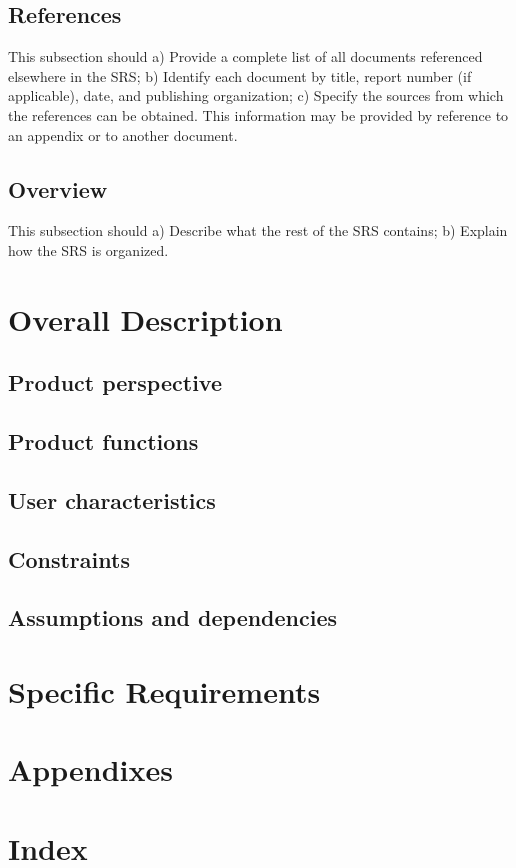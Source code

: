 \documentclass[10pt,letterpaper,onecolumn,draftclsnofoot]{IEEEtran}
\begin{document}
\subsection{References}
This subsection should
a) Provide a complete list of all documents referenced elsewhere in the SRS;
b) Identify each document by title, report number (if applicable), date, and publishing organization;
c) Specify the sources from which the references can be obtained.
This information may be provided by reference to an appendix or to another document.
\subsection{Overview}
This subsection should
a) Describe what the rest of the SRS contains;
b) Explain how the SRS is organized.
\clearpage
\section{Overall Description}
\subsection{Product perspective}
\subsection{Product functions}
\subsection{User characteristics}
\subsection{Constraints}
\subsection{Assumptions and dependencies}
\section{Specific Requirements}
\clearpage
\section{Appendixes}
\section{Index}
\end{document}
